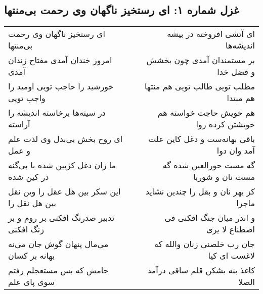 \begin{center}
\section*{غزل شماره ۱: ای رستخیز ناگهان وی رحمت بی‌منتها}
\label{sec:0001}
\begin{longtable}{l p{0.5cm} r}
ای رستخیز ناگهان وی رحمت بی‌منتها
&&
ای آتشی افروخته در بیشه اندیشه‌ها
\\
امروز خندان آمدی مفتاح زندان آمدی
&&
بر مستمندان آمدی چون بخشش و فضل خدا
\\
خورشید را حاجب تویی اومید را واجب تویی
&&
مطلب تویی طالب تویی هم منتها هم مبتدا
\\
در سینه‌ها برخاسته اندیشه را آراسته
&&
هم خویش حاجت خواسته هم خویشتن کرده روا
\\
ای روح بخش بی‌بدل وی لذت علم و عمل
&&
باقی بهانه‌ست و دغل کاین علت آمد وان دوا
\\
ما زان دغل کژبین شده با بی‌گنه در کین شده
&&
گه مست حورالعین شده گه مست نان و شوربا
\\
این سکر بین هل عقل را وین نقل بین هل نقل را
&&
کز بهر نان و بقل را چندین نشاید ماجرا
\\
تدبیر صدرنگ افکنی بر روم و بر زنگ افکنی
&&
و اندر میان جنگ افکنی فی اصطناع لا یری
\\
می‌مال پنهان گوش جان می‌نه بهانه بر کسان
&&
جان رب خلصنی زنان والله که لاغست ای کیا
\\
خامش که بس مستعجلم رفتم سوی پای علم
&&
کاغذ بنه بشکن قلم ساقی درآمد الصلا
\\
\end{longtable}
\end{center}
